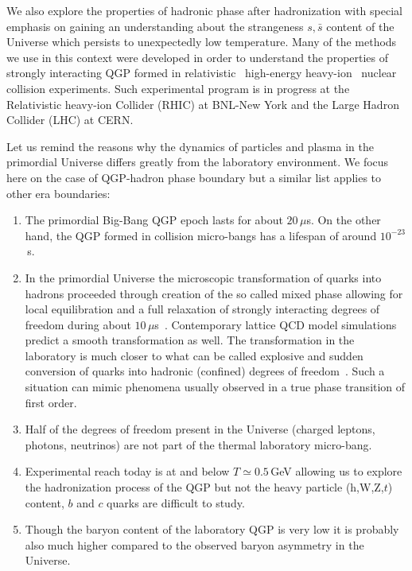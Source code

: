 We also explore the properties of hadronic phase after hadronization with special emphasis on gaining an understanding about the strangeness $s,\bar s$ content of the Universe which persists to unexpectedly low temperature. Many of the methods we use in this context were developed in order to understand the properties of strongly interacting QGP formed in relativistic \ie\ high-energy heavy-ion \ie\ nuclear collision experiments. Such experimental program is in progress at the Relativistic heavy-ion Collider (RHIC) at BNL-New York and the Large Hadron Collider (LHC) at CERN. 

Let us remind the reasons why the dynamics of particles and plasma in the primordial Universe differs greatly from the laboratory environment. We focus here on the case of QGP-hadron phase boundary but a similar list applies to other era boundaries:
\begin{enumerate} 
\item The primordial Big-Bang QGP epoch lasts for about $20\,\mu$s. On the other hand, the QGP formed in collision micro-bangs has a lifespan of around $10^{-23}$\,s. 
\item In the primordial Universe the microscopic transformation of quarks into hadrons proceeded through creation of the so called mixed phase allowing for local equilibration and a full relaxation of strongly interacting degrees of freedom during about $10\,\mu$s~\cite{Fromerth:2002wb}. Contemporary lattice QCD model simulations predict a smooth transformation as well. The transformation in the laboratory is much closer to what can be called explosive and sudden conversion of quarks into hadronic (confined) degrees of freedom~\cite{Rafelski:2000by}. Such a situation can mimic phenomena usually observed in a true phase transition of first order.
\item Half of the degrees of freedom present in the Universe (charged leptons, photons, neutrinos) are not part of the thermal laboratory micro-bang.
\item Experimental reach today is at and below $T\simeq 0.5$\,GeV allowing us to explore the hadronization process of the QGP but not the heavy particle (h,W,Z,$t$) content, $b$ and $c$ quarks are difficult to study. 
\item Though the baryon content of the laboratory QGP is very low it is probably also much higher compared to the observed baryon asymmetry in the Universe. 
\end{enumerate}
 
